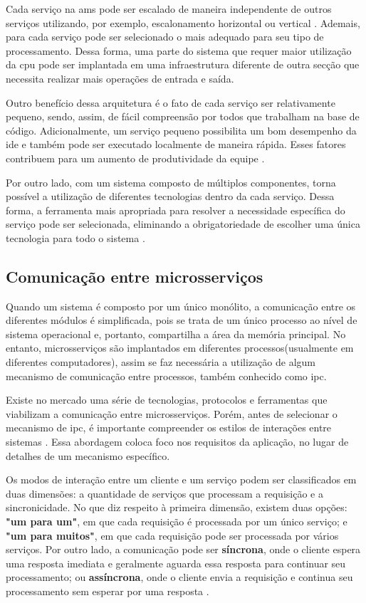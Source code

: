Cada serviço na \acrshort{ams} pode ser escalado de maneira independente de outros serviços utilizando, por exemplo, escalonamento horizontal ou vertical \cite{richardson2018microservices}. Ademais, para cada serviço pode ser selecionado o  mais adequado para seu tipo de processamento. Dessa forma, uma parte do sistema que requer maior utilização da \acrshort{cpu} pode ser implantada em uma infraestrutura diferente de outra secção que necessita realizar mais operações de entrada e saída.

Outro benefício dessa arquitetura é o fato de cada serviço ser relativamente pequeno, sendo, assim, de fácil compreensão por todos que trabalham na base de código. Adicionalmente, um serviço pequeno possibilita um bom desempenho da \acrshort{ide} e também pode ser executado localmente de maneira rápida. Esses fatores contribuem para um aumento de produtividade da equipe \cite{richardson2018microservices}.

Por outro lado, com um sistema composto de múltiplos componentes, torna possível a utilização de diferentes tecnologias dentro da cada serviço. Dessa forma, a ferramenta mais apropriada para resolver a necessidade específica do serviço pode ser selecionada, eliminando a obrigatoriedade de escolher uma única tecnologia para todo o sistema \cite{buildingMicroservices}.

\subsection{Comunicação entre microsserviços}
Quando um sistema é composto por um único monólito, a comunicação entre os diferentes módulos é simplificada, pois se trata de um único processo ao nível de sistema operacional e, portanto, compartilha a área da memória principal. No entanto, microsserviços são implantados em diferentes processos(usualmente em diferentes computadores), assim se faz necessária a utilização de algum mecanismo de comunicação entre processos, também conhecido como \acrfull{ipc}.

Existe no mercado uma série de tecnologias, protocolos e ferramentas que viabilizam a comunicação entre microsserviços. Porém, antes de selecionar o mecanismo de \acrshort{ipc}, é importante compreender os estilos de interações entre sistemas \cite{richardson2018microservices}. Essa abordagem coloca foco nos requisitos da aplicação, no lugar de detalhes de um mecanismo específico.

Os modos de interação entre um cliente e um serviço podem ser classificados em duas dimensões: a quantidade de serviços que processam a requisição e a sincronicidade. No que diz respeito à primeira dimensão, existem duas opções: \textbf{"um para um"}, em que cada requisição é processada por um único serviço; e \textbf{"um para muitos"}, em que cada requisição pode ser processada por vários serviços. Por outro lado, a comunicação pode ser \textbf{síncrona}, onde o cliente espera uma resposta imediata e geralmente aguarda essa resposta para continuar seu processamento; ou \textbf{assíncrona}, onde o cliente envia a requisição e continua seu processamento sem esperar por uma resposta \cite{richardson2018microservices}.

